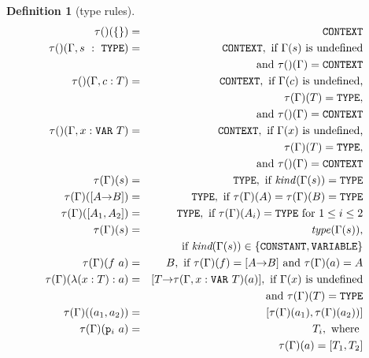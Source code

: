 \documentclass [12pt,twoside]{cslreport}
\newcommand{\thmbox}
   {{\ \hfill\hbox{%
      \vrule width1.0ex height1.0ex
   }\parfillskip 0pt }}
\newcommand{\aro}{\mathord\rightarrow} %
\newcommand{\funtype}[2]{[#1 \aro #2]}
\newcommand{\tupletype}[1]{[#1]}
\newcommand{\tauGamma}[1]{\tau(\Gamma)(#1)}
\newcommand{\proj}[1]{\mathtt{p}_{#1}}
\newcommand{\listwo}[2]{#1_{1}, #1_{2}}
\newcommand{\tttype}{\mathtt{TYPE}}
\newcommand{\ttcontext}{\mathtt{CONTEXT}}
\newcommand{\ttvar}{\mathtt{VAR}}
\newcommand{\ttconstant}{\mathtt{CONSTANT}}
\newcommand{\ttvariable}{\mathtt{VARIABLE}}
\newtheorem{definition}{Definition}
\newenvironment{Defn}[1]{\begin{definition}[#1]\label{defn:#1}}{
\thmbox\end{definition}}
\begin{document}
\begin{Defn}{type rules}
\begin{eqnarray*}
  \tau()(\{\}) & = & \ttcontext \\
%
  \tau()(\Gamma, s\ :\ \tttype{}) & = & \ttcontext, \mbox{ if }
  \Gamma(s) \mbox{ is undefined}\\& &
  \mbox{and } \tau()(\Gamma) = \ttcontext\\
%
  \tau()(\Gamma, c : T) & = & \ttcontext, \mbox{ if }
   \Gamma(c) \mbox{ is undefined,}\\ & & 
\tauGamma{T} =
      \tttype{},\\
   & & \mbox{and } \tau()(\Gamma) = \ttcontext\\
%
  \tau()(\Gamma, x : \ttvar{}\ T) & = & \ttcontext, \mbox{ if }
  \Gamma(x) \mbox{ is undefined,}\\ & & 
\tauGamma{T}
    = \tttype{},\\
    & & \mbox{and } \tau()(\Gamma) = \ttcontext\\ 
%
  \tauGamma{s} & = & \tttype{}, \mbox{ if } \textit{kind\/}(\Gamma(s)) =
\tttype{}\\
%
  \tauGamma{\funtype{A}{B}} & = & \tttype{}, \mbox{ if } \tauGamma{A} =
     \tauGamma{B} = \tttype{}\\
%
  \tauGamma{\tupletype{\listwo{A}{n}}} & = & \tttype{}, \mbox{ if }
     \tauGamma{A_i} = \tttype{} \mbox{ for } 1\leq i\leq 2 \\
%
  \tau(\Gamma)(s) & = &  \textit{type\/}(\Gamma(s)),\\
                    & &  \mbox{ if } 
\textit{kind}(\Gamma(s)) \in \{ \ttconstant{}, \ttvariable \} \\
%
 \tau(\Gamma)(f\ a) & = & B, \mbox{ if } \tau(\Gamma)(f) = \funtype{A}{B}
\mbox{ and } \tau(\Gamma)(a) = A \\
%
\tauGamma{\lambda (x : T): a} & = & \funtype{T}{\tau(\Gamma, x : \ttvar{}\ T)(a)},
\mbox{ if } \Gamma(x) \mbox{ is undefined}\\& & 
  \mbox{and }\tauGamma{T} = \tttype{}\\
%
\tau(\Gamma)((a_1, a_2)) & = &
    [\tau(\Gamma)(a_1),  \tau(\Gamma)(a_2))]\\
%
\tau(\Gamma)(\proj{i}\ a) & = & T_i, \mbox{ where }\\ & & 
 \tau(\Gamma)(a) = [T_1, T_2] %
\end{eqnarray*}
\end{Defn}
\end{document}
